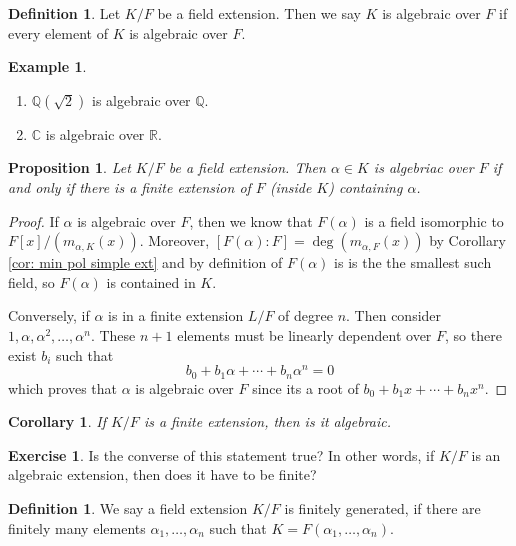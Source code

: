 \documentclass[11pt,a4paper]{report}
\theoremstyle{plain}
\newtheorem{cor}[subsection]{Corollary}
\newtheorem{prop}[subsection]{Proposition}
\theoremstyle{definition}
\newtheorem{definition}[subsection]{Definition}
\newtheorem{exmp}[subsection]{Example}
\theoremstyle{definition}
\newtheorem{question}[subsection]{Exercise}
\newcommand{\RR}{\mathbb{R}}
\def\CC{\mathbb{C}}
\def\QQ{\mathbb{Q}}
\def \a{\alpha}
\begin{document}
	
	\begin{definition}
		Let $K/F$ be a field extension. Then we say $K$ is algebraic over $F$ if every element of $K$ is algebraic over $F$.
	\end{definition}
	
	\begin{exmp}
		\begin{enumerate}
			\item $\QQ(\sqrt{2})$ is algebraic over $\QQ$.
			\item $\CC$ is algebraic over $\RR$.
		\end{enumerate}
	\end{exmp}
	
	\begin{prop}
		\label{prop : alg_iff_fin}
		Let $K/F$ be a field extension. Then $\a \in K$ is algebriac over $F$ if and only if there is a finite extension of $F$ (inside $K$) containing $\a$.
	\end{prop}
	
	\begin{proof}
		If $\a$ is algebraic over $F$, then we know that $F(\a)$ is a field isomorphic to $F[x]/(m_{\a,K}(x))$. Moreover, $[F(\a):F]=\deg(m_{\a,F}(x))$ by Corollary \ref{cor: min pol simple ext} and by definition of $F(\a)$ is is the the smallest such field, so $F(\a)$ is contained in $K$.
		
		Conversely, if $\a$ is in a finite extension $L/F$ of degree $n$. Then consider $1,\a,\a^2,\dots,\a^n$. These $n+1$ elements must be linearly dependent over $F$, so there exist $b_i$ such that \[b_0+b_1\a+\cdots+b_n\a^n=0\] which proves that $\a$ is algebraic over $F$ since its a root of $b_0+b_1x+\cdots+b_n x^n$.
	\end{proof}
	
	\begin{cor}\label{cor: fin ext is alg}
		If $K/F$ is a finite extension, then is it algebraic.
	\end{cor}
	\begin{question}
		Is the converse of this statement true? In other words, if $K/F$ is an algebraic extension, then does it have to be finite?
	\end{question}
	
	
	\begin{definition}
		We say a field extension $K/F$ is finitely generated, if there are finitely many elements $\a_1,\dots,\a_n$ such that $K=F(\a_1,\dots,\a_n)$.
	\end{definition}
	
\end{document}
